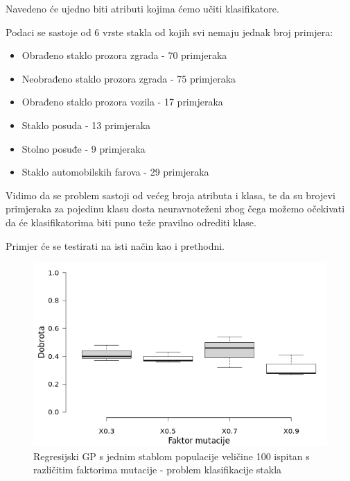 \documentclass[times, utf8, zavrsni]{fer}
\begin{document}
Navedeno će ujedno biti atributi kojima ćemo učiti klasifikatore.

Podaci se sastoje od 6 vrste stakla od kojih svi nemaju jednak broj primjera:

\begin{itemize}
\item Obrađeno staklo prozora zgrada - 70 primjeraka
\item Neobrađeno staklo prozora zgrada - 75 primjeraka
\item Obrađeno staklo prozora vozila - 17 primjeraka
\item Staklo posuda - 13 primjeraka
\item Stolno posuđe - 9 primjeraka
\item Staklo automobilskih farova - 29 primjeraka

\end{itemize}

Vidimo da se problem sastoji od većeg broja atributa i klasa, te da su brojevi primjeraka za pojedinu klasu dosta neuravnoteženi zbog čega možemo očekivati da će klasifikatorima biti puno teže pravilno odrediti klase.

Primjer će se testirati na isti način kao i prethodni.

\begin{figure}[htb]
\centering
\includegraphics[scale=0.5]{grafovi/boxplotGlassSTest}
\caption{Regresijski GP s jednim stablom populacije veličine 100 ispitan s različitim faktorima mutacije - problem klasifikacije stakla}
\end{figure}
\end{document}
